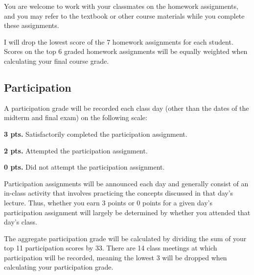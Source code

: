 You are welcome to work with your classmates on the homework assignments, and you may refer to the textbook or other course materials while you complete these assignments.

I will drop the lowest score of the 7 homework assignments for each student. Scores on the top 6 graded homework assignments will be equally weighted when calculating your final course grade.

\subsection*{Participation}
A participation grade will be recorded each class day (other than the dates of the midterm and final exam) on the following scale:

\begin{ul}
    \item \textbf{3 pts.} Satisfactorily completed the participation assignment.
    \item \textbf{2 pts.} Attempted the participation assignment.
    \item \textbf{0 pts.} Did not attempt the participation assignment.
\end{ul}

Participation assignments will be announced each day and generally consist of an in-class activity that involves practicing the concepts discussed in that day's lecture. Thus, whether you earn 3 points or 0 points for a given day's participation assignment will largely be determined by whether you attended that day's class.

The aggregate participation grade will be calculated by dividing the sum of your top 11 participation scores by 33. There are 14 class meetings at which participation will be recorded, meaning the lowest 3 will be dropped when calculating your participation grade.
